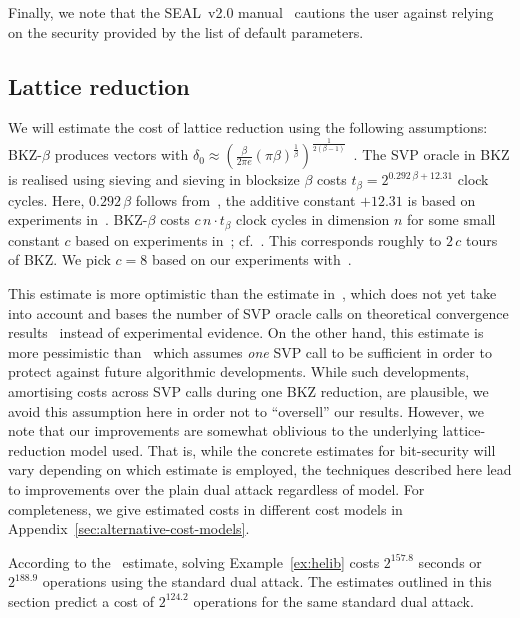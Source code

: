 \documentclass[a4paper]{llncs}
\begin{document}
Finally, we note that the SEAL~v2.0 manual~\cite{LaiPla16} cautions the user against relying on the security provided by the list of default parameters.

\subsection{Lattice reduction}\label{sec:lattice-reduction}

We will estimate the cost of lattice reduction using the following assumptions: BKZ-$β$ produces vectors with $δ_0 ≈ {\left( \frac{β}{2 π e} {(π β)}^{\frac{1}{β}}  \right)}^{\frac{1}{2(β-1)}}$~\cite{PhD:Chen13}. The SVP oracle in BKZ is realised using sieving and sieving in blocksize $β$ costs $t_β = 2^{0.292\,β + 12.31}$ clock cycles. Here, $0.292\,β$ follows from~\cite{SODA:BDGL16}, the additive constant $+ 12.31$ is based on experiments in~\cite{C:Laarhoven15}. BKZ-$β$ costs $c\,n \cdot t_β$ clock cycles in dimension $n$ for some small constant \(c\) based on experiments in~\cite{PhD:Chen13}; cf.~\cite[Figure~4.6]{PhD:Chen13}. This corresponds roughly to \(2\,c\) tours of BKZ\@. We pick \(c=8\) based on our experiments with~\cite{fplll}.

This estimate is more optimistic than the estimate in~\cite{JMC:AlbPlaSco15}, which does not yet take~\cite{SODA:BDGL16} into account and bases the number of SVP oracle calls on theoretical convergence results~\cite{C:HanPujSte11} instead of experimental evidence. On the other hand, this estimate is more pessimistic than~\cite{CCS:BCDMNN16} which assumes \emph{one} SVP call to be sufficient in order to protect against future algorithmic developments. While such developments, amortising costs across SVP calls during one BKZ reduction, are plausible, we avoid this assumption here in order not to ``oversell'' our results. However, we note that our improvements are somewhat oblivious to the underlying lattice-reduction model used. That is, while the concrete estimates for bit-security will vary depending on which estimate is employed, the techniques described here lead to improvements over the plain dual attack regardless of model. For completeness, we give estimated costs in different cost models in Appendix~\ref{sec:alternative-cost-models}.

According to the~\cite{RSA:LinPei11} estimate, solving Example~\ref{ex:helib} costs $2^{157.8}$ seconds or $2^{188.9}$ operations using the standard dual attack. The estimates outlined in this section predict a cost of $2^{124.2}$ operations for the same standard dual attack.
\end{document}
